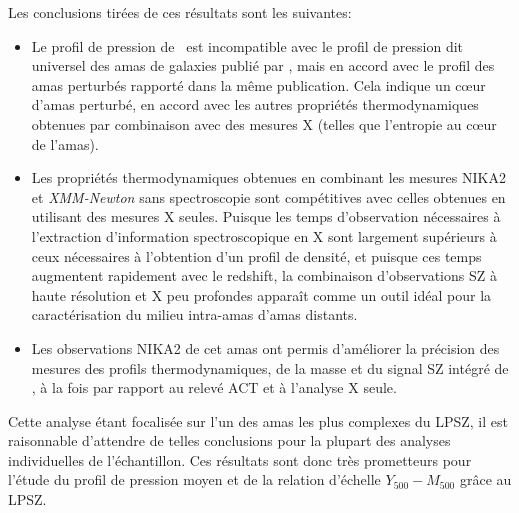 \vspace{5pt}
Les conclusions tirées de ces résultats sont les suivantes:
\begin{itemize}[leftmargin=*]
\setlength\itemsep{5pt}
\item
    Le profil de pression de \act\ est incompatible avec le profil de pression dit universel des amas de galaxies publié par , mais en accord avec le profil des amas perturbés rapporté dans la même publication.
    Cela indique un cœur d'amas perturbé, en accord avec les autres propriétés thermodynamiques obtenues par combinaison avec des mesures X (telles que l'entropie au cœur de l'amas).

\item
    Les propriétés thermodynamiques obtenues en combinant les mesures NIKA2 et \textit{XMM-Newton} sans spectroscopie sont compétitives avec celles obtenues en utilisant des mesures X seules.
    Puisque les temps d'observation nécessaires à l'extraction d'information spectroscopique en X sont largement supérieurs à ceux nécessaires à l'obtention d'un profil de densité, et puisque ces temps augmentent rapidement avec le redshift, la combinaison d'observations SZ à haute résolution et X peu profondes apparaît comme un outil idéal pour la caractérisation du milieu intra-amas d'amas distants.

\item
    Les observations NIKA2 de cet amas ont permis d'améliorer la précision des mesures des profils thermodynamiques, de la masse et du signal SZ intégré de \act, à la fois par rapport au relevé ACT et à l'analyse X seule.
\end{itemize}

Cette analyse étant focalisée sur l'un des amas les plus complexes du LPSZ, il est raisonnable d'attendre de telles conclusions pour la plupart des analyses individuelles de l'échantillon.
Ces résultats sont donc très prometteurs pour l'étude du profil de pression moyen et de la relation d'échelle $Y_{500}-M_{500}$ grâce au LPSZ.
